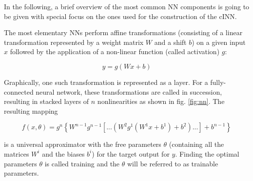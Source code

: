 In the following, a brief overview of the most common NN components is going to be given with special focus on the ones used for the construction of the cINN.

The most elementary NNs perform affine transformations (consisting of a linear transformation represented by a weight matrix $W$ and a shift $b$) on a given input $x$ followed by the application of a non-linear function (called activation) $g$:

\begin{equation*}
	y = g(Wx+b)
\end{equation*}

Graphically, one such transformation is represented as a layer. For a fully-connected neural network, these transformations are called in succession, resulting in stacked layers of $n$ nonlinearities as shown in fig. \ref{fig:nn}. The resulting mapping

\begin{equation*}
	f(x, \theta) = g^n\left\{W^{n-1}g^{n-1}\left[ ... \left(W^2g^1(W^1x+b^1)+b^2\right)...\right]+b^{n-1}\right\}
\end{equation*}

is a universal approximator with the free parameters $\theta$ (containing all the matrices $W^i$ and the biases $b^i$) for the target output for $y$. Finding the optimal parameters $\theta$ is called training and the $\theta$ will be referred to as trainable parameters.

